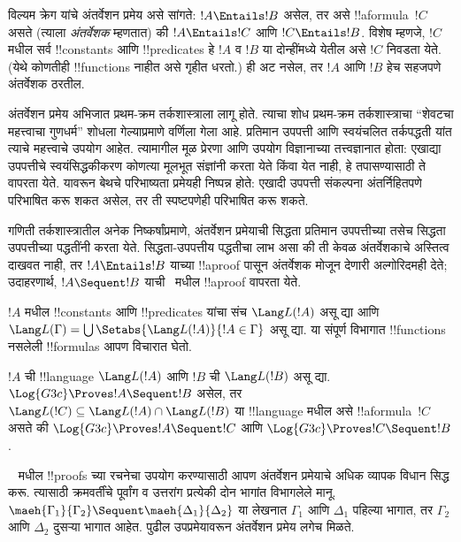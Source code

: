 \documentclass[../../../include/open-logic-section]{subfiles}
\begin{document}


विल्यम क्रेग यांचे अंतर्वेशन प्रमेय असे सांगते:
$!A \Entails !B$ असेल, तर असे !!a{formula}~$!C$
असते (त्याला \emph{अंतर्वेशक} म्हणतात) की
$!A \Entails !C$ आणि $!C \Entails !B$.
विशेष म्हणजे, $!C$ मधील सर्व !!{constant}s आणि
!!{predicate}s हे $!A$ व $!B$ या दोन्हींमध्ये येतील
असे $!C$ निवडता येते. (येथे कोणतीही !!{function}s
नाहीत असे गृहीत धरतो.) ही अट नसेल, तर
$!A$ आणि $!B$ हेच सहजपणे अंतर्वेशक ठरतील.

अंतर्वेशन प्रमेय अभिजात प्रथम-क्रम तर्कशास्त्राला लागू होते.
त्याचा शोध प्रथम-क्रम तर्कशास्त्राचा “शेवटचा महत्त्वाचा गुणधर्म”
शोधला गेल्याप्रमाणे वर्णिला गेला आहे.
प्रतिमान उपपत्ती आणि स्वयंचलित तर्कपद्धती यांत त्याचे
महत्त्वाचे उपयोग आहेत. त्यामागील मूळ प्रेरणा आणि
उपयोग विज्ञानाच्या तत्त्वज्ञानात होता: एखाद्या उपपत्तीचे
स्वयंसिद्धकीकरण कोणत्या मूलभूत संज्ञांनी करता येते
किंवा येत नाही, हे तपासण्यासाठी ते वापरता येते.
यावरून बेथचे परिभाष्यता प्रमेयही निष्पन्न होते:
एखादी उपपत्ती संकल्पना अंतर्निहितपणे परिभाषित करू
शकत असेल, तर ती स्पष्टपणेही परिभाषित करू शकते.

गणिती तर्कशास्त्रातील अनेक निष्कर्षांप्रमाणे,
अंतर्वेशन प्रमेयाची सिद्धता प्रतिमान उपपत्तीच्या
तसेच सिद्धता उपपत्तीच्या पद्धतींनी करता येते.
सिद्धता-उपपत्तीय पद्धतीचा लाभ असा की ती
केवळ अंतर्वेशकाचे अस्तित्व दाखवत नाही, तर
$!A \Entails !B$ याच्या !!a{proof} पासून
अंतर्वेशक मोजून देणारी अल्गोरिदमही देते;
उदाहरणार्थ, $!A \Sequent !B$ याची~
मधील !!a{proof} वापरता येते.

$!A$ मधील !!{constant}s आणि !!{predicate}s
यांचा संच $\Lang L(!A)$ असू द्या आणि
$\Lang L(\Gamma) = \bigcup \Setabs{\Lang L(!A)}{!A \in
\Gamma}$ असू द्या. या संपूर्ण विभागात
!!{function}s नसलेली !!{formula}s आपण विचारात घेतो.

\begin{thm}[क्रेगचे अंतर्वेशन प्रमेय]
$!A$ ची !!{language} $\Lang L(!A)$ आणि
$!B$ ची $\Lang L(!B)$ असू द्या.
$\Log{G3c} \Proves !A \Sequent !B$ असेल, तर
$\Lang L(!C) \subseteq \Lang L(!A) \cap \Lang L(!B)$
या !!{language} मधील असे !!a{formula}~$!C$ असते की
$\Log{G3c} \Proves !A \Sequent !C$
आणि $\Log{G3c} \Proves !C \Sequent !B$.
\end{thm}

~ मधील !!{proof}s च्या रचनेचा
उपयोग करण्यासाठी आपण अंतर्वेशन प्रमेयाचे
अधिक व्यापक विधान सिद्ध करू.
त्यासाठी क्रमवर्तींचे पूर्वांग व उत्तरांग
प्रत्येकी दोन भागांत विभागलेले मानू.
$\maeh{\Gamma_1}{\Gamma_2} \Sequent
\maeh{\Delta_1}{\Delta_2}$ या लेखनात
$\Gamma_1$ आणि $\Delta_1$ पहिल्या भागात,
तर $\Gamma_2$ आणि $\Delta_2$ दुसऱ्या
भागात आहेत. पुढील उपप्रमेयावरून
अंतर्वेशन प्रमेय लगेच मिळते.
\end{document}
